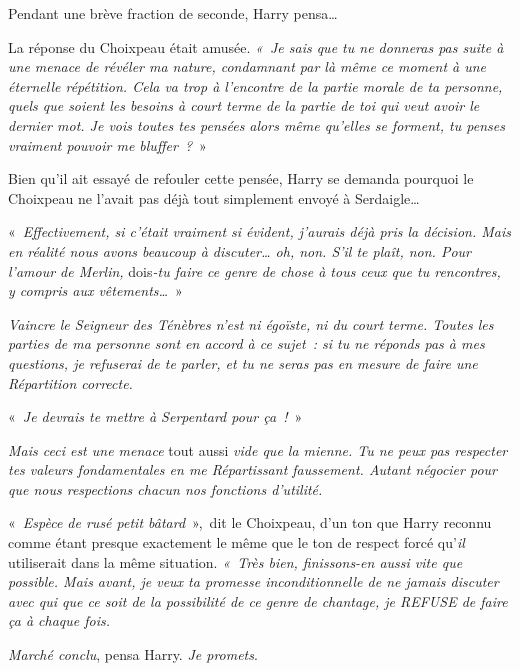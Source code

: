 Pendant une brève fraction de seconde, Harry pensa…

La réponse du Choixpeau était amusée.
\emph{«~Je sais que tu ne donneras pas suite à une menace de révéler ma nature, condamnant par là même ce moment à une éternelle répétition.
Cela va trop à l'encontre de la partie morale de ta personne, quels que soient les besoins à court terme de la partie de toi qui veut avoir le dernier mot.
Je vois toutes tes pensées alors même qu'elles se forment, tu penses vraiment pouvoir me bluffer~?}~»

Bien qu'il ait essayé de refouler cette pensée, Harry se demanda pourquoi le Choixpeau ne l'avait pas déjà tout simplement envoyé à Serdaigle…

«~\emph{Effectivement, si c'était vraiment si évident, j'aurais déjà pris la décision.
Mais en réalité nous avons beaucoup à discuter… oh, non.
S'il te plaît, non.
Pour l'amour de Merlin,} dois\emph{-tu faire ce genre de chose à tous ceux que tu rencontres, y compris aux vêtements…}~»

\emph{Vaincre le Seigneur des Ténèbres n'est ni égoïste, ni du court terme. Toutes les parties de ma personne sont en accord à ce sujet~: si tu ne réponds pas à mes questions, je refuserai de te parler, et tu ne seras pas en mesure de faire une Répartition correcte.}

«~\emph{Je devrais te mettre à Serpentard pour ça~!}~»

\emph{Mais ceci est une menace} tout aussi \emph{vide que la mienne.
Tu ne peux pas respecter tes valeurs fondamentales en me Répartissant faussement.
Autant négocier pour que nous respections chacun nos fonctions d'utilité.}

«~\emph{Espèce de rusé petit bâtard}~»,~dit le Choixpeau, d'un ton que Harry reconnu comme étant presque exactement le même que le ton de respect forcé qu'\emph{il} utiliserait dans la même situation.
\emph{«~Très bien, finissons-en aussi vite que possible.
Mais avant, je veux ta promesse inconditionnelle de ne jamais discuter avec qui que ce soit de la possibilité de ce genre de chantage, je REFUSE de faire ça à chaque fois.}

\emph{Marché conclu}, pensa Harry. \emph{Je promets}.

